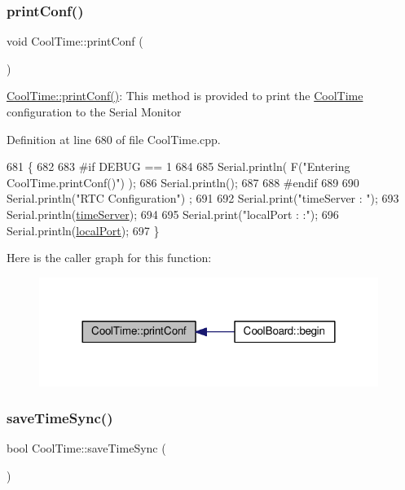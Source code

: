 \subsubsection{\texorpdfstring{print\+Conf()}{printConf()}}
{\footnotesize\ttfamily void Cool\+Time\+::print\+Conf (\begin{DoxyParamCaption}{ }\end{DoxyParamCaption})}

\hyperlink{class_cool_time_af355e7f9b3898211cd2ff25eab5933b1}{Cool\+Time\+::print\+Conf()}\+: This method is provided to print the \hyperlink{class_cool_time}{Cool\+Time} configuration to the Serial Monitor 

Definition at line 680 of file Cool\+Time.\+cpp.


\begin{DoxyCode}
681 \{
682 
683 \textcolor{preprocessor}{#if DEBUG == 1}
684 
685     Serial.println( F(\textcolor{stringliteral}{"Entering CoolTime.printConf()"}) );
686     Serial.println();
687 
688 \textcolor{preprocessor}{#endif }
689 
690     Serial.println(\textcolor{stringliteral}{"RTC Configuration"}) ;
691 
692     Serial.print(\textcolor{stringliteral}{"timeServer : "});
693     Serial.println(\hyperlink{class_cool_time_ad2b9858f399108cb440dd1e908916f04}{timeServer});
694     
695     Serial.print(\textcolor{stringliteral}{"localPort : :"});
696     Serial.println(\hyperlink{class_cool_time_a2f777da44d7ba678be8185299e9b49d1}{localPort});
697 \}
\end{DoxyCode}
Here is the caller graph for this function\+:\nopagebreak
\begin{figure}[H]
\begin{center}
\leavevmode
\includegraphics[width=312pt]{d6/d49/class_cool_time_af355e7f9b3898211cd2ff25eab5933b1_icgraph}
\end{center}
\end{figure}
\mbox{\label{class_cool_time_ae9658c9b377510d469e3b88edf33ee85}} 
\subsubsection{\texorpdfstring{save\+Time\+Sync()}{saveTimeSync()}}
{\footnotesize\ttfamily bool Cool\+Time\+::save\+Time\+Sync (\begin{DoxyParamCaption}{ }\end{DoxyParamCaption})}

